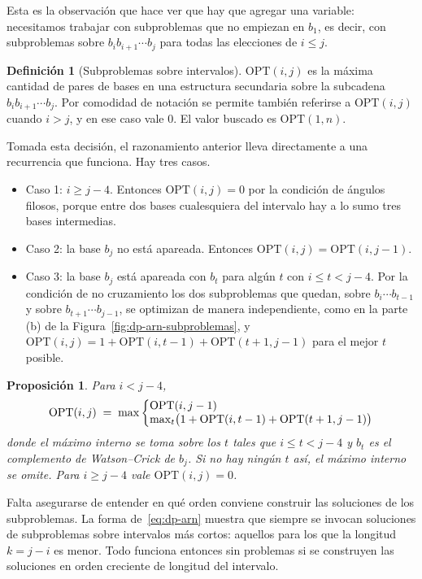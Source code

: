\documentclass[12pt, spanish, oneside, openany]{book}
\theoremstyle{uprightplain}
\newtheorem{proposicion}[teorema]{Proposición}
\theoremstyle{definition}
\newtheorem{definicion}[teorema]{Definición}
\theoremstyle{remark}
\theoremstyle{definition}
\newcommand{\OPT}{\mathrm{OPT}} %
\begin{document}
Esta es la observación que hace ver que hay que agregar una variable: necesitamos trabajar con subproblemas que no empiezan en $b_1$, es decir, con subproblemas sobre $b_ib_{i+1}\cdots b_j$ para todas las elecciones de $i\le j$.

\begin{definicion}[Subproblemas sobre intervalos]
\label{def:dp-opt-arn}
$\OPT(i,j)$ es la máxima cantidad de pares de bases en una estructura secundaria sobre la subcadena $b_ib_{i+1}\cdots b_j$. Por comodidad de notación se permite también referirse a $\OPT(i,j)$ cuando $i>j$, y en ese caso vale $0$. El valor buscado es $\OPT(1,n)$.
\end{definicion}

Tomada esta decisión, el razonamiento anterior lleva directamente a una recurrencia que funciona. Hay tres casos.
\begin{itemize}
    \item Caso 1: $i\ge j-4$. Entonces $\OPT(i,j)=0$ por la condición de ángulos filosos, porque entre dos bases cualesquiera del intervalo hay a lo sumo tres bases intermedias.
    \item Caso 2: la base $b_j$ no está apareada. Entonces $\OPT(i,j)=\OPT(i,j-1)$.
    \item Caso 3: la base $b_j$ está apareada con $b_t$ para algún $t$ con $i\le t<j-4$. Por la condición de no cruzamiento los dos subproblemas que quedan, sobre $b_i\cdots b_{t-1}$ y sobre $b_{t+1}\cdots b_{j-1}$, se optimizan de manera independiente, como en la parte (b) de la Figura~\ref{fig:dp-arn-subproblemas}, y $\OPT(i,j)=1+\OPT(i,t-1)+\OPT(t+1,j-1)$ para el mejor $t$ posible.
\end{itemize}

\begin{proposicion}
\label{prop:dp-arn}
Para $i<j-4$,
\begin{equation}
\label{eq:dp-arn}
\OPT(i,j) \;=\; \max\left\{\begin{array}{@{}l@{}}\OPT(i,j-1)\\ \max_{t}\bigl(1+\OPT(i,t-1)+\OPT(t+1,j-1)\bigr)\end{array}\right.
\end{equation}
donde el máximo interno se toma sobre los $t$ tales que $i\le t<j-4$ y $b_t$ es el complemento de Watson--Crick de $b_j$. Si no hay ningún $t$ así, el máximo interno se omite. Para $i\ge j-4$ vale $\OPT(i,j)=0$.
\end{proposicion}

Falta asegurarse de entender en qué orden conviene construir las soluciones de los subproblemas. La forma de~\eqref{eq:dp-arn} muestra que siempre se invocan soluciones de subproblemas sobre intervalos más cortos: aquellos para los que la longitud $k=j-i$ es menor. Todo funciona entonces sin problemas si se construyen las soluciones en orden creciente de longitud del intervalo.
\end{document}

